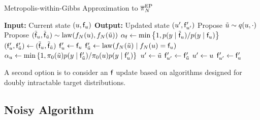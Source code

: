 \documentclass[12pt]{article}
\begin{document}
\begin{algorithm}
    \caption{Metropolis-within-Gibbs Approximation to ${\overline{\pi}}_{N}^{\mathrm{EP}}$}
    \label{alg:mwg-ep}
    \begin{algorithmic}[1] 
    \State \textbf{Input:} Current state $(u, \mathsf{f}_u)$
    \State \textbf{Output:} Updated state $(u^\prime, \mathsf{f}^\prime_{u^\prime})$
     \State Propose $\tilde{u} \sim q(u, \cdot)$
     \State Propose $(\tilde{\mathsf{f}}_u, \tilde{\mathsf{f}}_{\tilde{u}}) \sim \mathrm{law}(f_{N}(u), f_{N}(\tilde{u}))$ 
     \State $\alpha_{\mathsf{f}} \gets \min\left\{1, p(y \mid \tilde{\mathsf{f}}_u) / p(y \mid \mathsf{f}_u) \right\}$
                \State $(\mathsf{f}^\prime_u, \mathsf{f}^\prime_{\tilde{u}}) \gets (\tilde{\mathsf{f}}_u, \tilde{\mathsf{f}}_{\tilde{u}})$ 
            \Else
                \State $\mathsf{f}^\prime_{u} \gets \mathsf{f}_{u}$
                \State $\mathsf{f}^\prime_{\tilde{u}} \gets \mathrm{law}(f_{N}(\tilde{u}) \mid f_{N}(u) = \mathsf{f}_u)$
            \EndIf
      \State $\alpha_{u} \gets \min\left\{1, \pi_0(\tilde{u} )p(y \mid \mathsf{f}^\prime_{\tilde{u}}) / \pi_0(u) p(y \mid \mathsf{f}^\prime_{u}) \right\}$ 
                \State $u^\prime \gets \tilde{u}$
                \State $\mathsf{f}^\prime_{u^\prime} \gets \mathsf{f}^\prime_{\tilde{u}}$ 
            \Else
            	\State $u^\prime \gets u$
		\State $\mathsf{f}^\prime_{u^\prime} \gets \mathsf{f}^\prime_{u}$
            \EndIf
    \end{algorithmic}
\end{algorithm}

A second option is to consider an $\mathsf{f}$ update based on algorithms designed 
for doubly intractable target distributions. 














\subsection{Noisy Algorithm}
\end{document}
